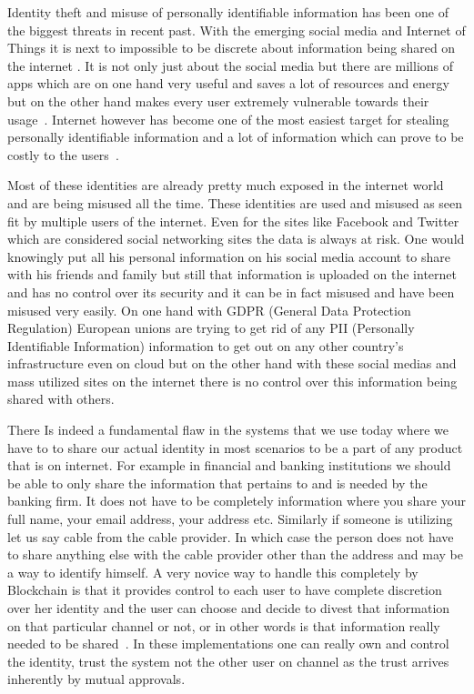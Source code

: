 Identity theft and misuse of personally identifiable information has
been one of the biggest threats in recent past. With the emerging
social media and Internet of Things it is next to impossible to be
discrete about information being shared on the internet
\cite{reuters20}. It is not only just about the social media but there
are millions of apps which are on one hand very useful and saves a lot
of resources and energy but on the other hand makes every user
extremely vulnerable towards their usage~\cite{statista21}. Internet
however has become one of the most easiest target for stealing
personally identifiable information and a lot of information which can
prove to be costly to the users~\cite{hedayati22}.

Most of these identities are already pretty much exposed in the
internet world and are being misused all the time. These identities
are used and misused as seen fit by multiple users of the internet.
Even for the sites like Facebook and Twitter which are considered
social networking sites the data is always at risk. One would
knowingly put all his personal information on his social media account
to share with his friends and family but still that information is
uploaded on the internet and has no control over its security and it
can be in fact misused and have been misused very easily. On one hand
with GDPR (General Data Protection Regulation) European unions
are trying to get rid of any PII (Personally Identifiable
  Information) information to get out on any other country's
infrastructure even on cloud but on the other hand with these social
medias and mass utilized sites on the internet there is no control over
this information being shared with others.


There Is indeed a fundamental flaw in the systems that we use today
where we have to to share our actual identity in most scenarios to be
a part of any product that is on internet. For example in financial
and banking institutions we should be able to only share the
information that pertains to and is needed by the banking firm. It
does not have to be completely information where you share your full
name, your email address, your address etc. Similarly if someone is
utilizing let us say cable from the cable provider. In which case the
person does not have to share anything else with the cable provider
other than the address and may be a way to identify himself. A very
novice way to handle this completely by Blockchain is that it provides
control to each user to have complete discretion over her identity and
the user can choose and decide to divest that information on that
particular channel or not, or in other words is that information
really needed to be shared~\cite{alex23}. In these implementations one
can really own and control the identity, trust the system not the
other user on channel as the trust arrives inherently by mutual
approvals.


